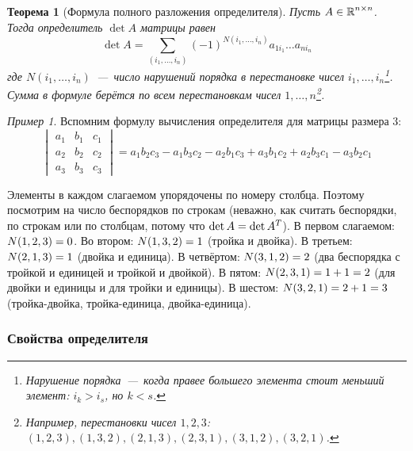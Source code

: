 \documentclass[a4paper,12pt]{article}
\newtheorem{theorem}{Теорема}[section]
\theoremstyle{definition}
\theoremstyle{remark}
\newtheorem*{example}{Пример}
\theoremstyle{remark}
\theoremstyle{remark}
\begin{document}
  \begin{theorem}[Формула полного разложения определителя]\label{theor:complete-expansion}
    Пусть $A \in \operatorname{\mathbb R}^{n \times n}$.
    Тогда определитель $\det A$ матрицы равен
    \begin{equation}
      \label{eq:complete-expansion}
      \det A = \sum_{(i_1, \ldots, i_n)} (-1)^{N(i_1, \ldots, i_n)} a_{1 i_1} \ldots a_{n i_n}
    \end{equation}
    где $N(i_1, \ldots, i_n)$~---~число нарушений порядка в перестановке чисел $i_1, \ldots, i_n$\footnote{Нарушение порядка~---~когда правее большего элемента стоит меньший элемент: $i_k > i_s$, но $k < s$.}.
    Сумма в формуле берётся по всем перестановкам чисел $1, \ldots, n$\footnote{Например, перестановки чисел $1, 2, 3$: $(1, 2, 3), (1, 3, 2), (2, 1, 3), (2, 3, 1), (3, 1, 2), (3, 2, 1)$.}.
  \end{theorem}
  
  \begin{example}
    Вспомним формулу вычисления определителя для матрицы размера $3$:
    \begin{equation*}
      \begin{vmatrix}
        a_1 & b_1 & c_1\\
        a_2 & b_2 & c_2\\
        a_3 & b_3 & c_3
      \end{vmatrix}
        = a_1 b_2 c_3 - a_1 b_3 c_2 - a_2 b_1 c_3 + a_3 b_1 c_2 + a_2 b_3 c_1 - a_3 b_2 c_1
    \end{equation*}
    
    Элементы в каждом слагаемом упорядочены по номеру столбца.
    Поэтому посмотрим на число беспорядков по строкам (неважно, как считать беспорядки, по строкам или по столбцам, потому что $\det A \hm= \det A^T$).
    В первом слагаемом: $N(1, 2, 3) \hm= 0$.
    Во втором: $N(1, 3, 2) \hm= 1$ (тройка и двойка).
    В третьем: $N(2, 1, 3) \hm= 1$ (двойка и единица).
    В четвёртом: $N(3, 1, 2) \hm= 2$ (два беспорядка с тройкой и единицей и тройкой и двойкой).
    В пятом: $N(2, 3, 1) \hm= 1 \hm+ 1 \hm= 2$ (для двойки и единицы и для тройки и единицы).
    В шестом: $N(3, 2, 1) \hm= 2 \hm+ 1 \hm= 3$ (тройка-двойка, тройка-единица, двойка-единица).
  \end{example}
  
  
  \subsubsection{Свойства определителя}
  
\end{document}
